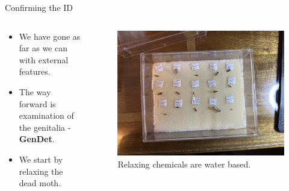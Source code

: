 \documentclass[
  ignorenonframetext,
]{beamer}
\providecommand{\tightlist}{%
  \setlength{\itemsep}{0pt}\setlength{\parskip}{0pt}}
\begin{document}
\begin{frame}{Confirming the ID}
\protect\hypertarget{confirming-the-id}{}
\begin{columns}[T]
\begin{column}{0.5\textwidth}
\begin{itemize}
\tightlist
\item
  We have gone as far as we can with external features.
\item
  The way forward is examination of the genitalia - \textbf{GenDet}.
\item
  We start by relaxing the dead moth.
\end{itemize}
\end{column}

\begin{column}{0.5\textwidth}
\begin{figure}
\centering
\includegraphics{./images/relaxing.jpg}
\caption{Relaxing chemicals are water based.}
\end{figure}
\end{column}
\end{columns}
\end{frame}
\end{document}

